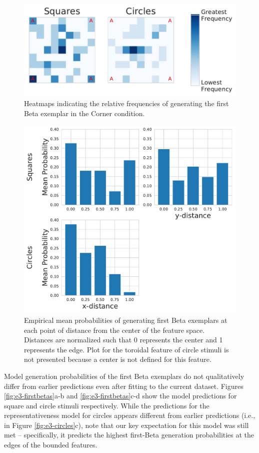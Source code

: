 \documentclass[pdflatex,sn-apa]{sn-jnl}%
\theoremstyle{thmstyleone}%
\theoremstyle{thmstyletwo}%
\theoremstyle{thmstylethree}%
\begin{document}
\begin{figure}
    \begin{center}
      \includegraphics[width=.6\textwidth]{figs/e3-behave.pdf}
    \caption{Heatmaps indicating the relative frequencies of generating the
      first Beta exemplar in the Corner condition.}
    \label{fig:e3-behave}
    \end{center}
\end{figure}

\begin{figure}
    \begin{center}
      \includegraphics[width=.6\textwidth]{figs/e3-distcent.pdf}
      \caption{Empirical mean probabilities of generating first Beta exemplars
        at each point of distance from the center of the feature space.
        Distances are normalized such that 0 represents the center and 1
        represents the edge. Plot for the toroidal feature of circle stimuli is
        not presented because a center is not defined for this feature.}
    \label{fig:e3-distcent}
    \end{center}
\end{figure}


Model generation probabilities of the first Beta exemplars do not qualitatively differ from earlier predictions even
after fitting to the current dataset. Figures \ref{fig:e3-firstbetas}a-b and \ref{fig:e3-firstbetas}c-d show the model
predictions for square and circle stimuli respectively. While the predictions for the representativeness model for
circles appears different from earlier predictions (i.e., in Figure \ref{fig:e3-circles}c), note that our key
expectation for this model was still met -- specifically, it predicts the highest first-Beta generation probabilities at
the edges of the bounded features.
\end{document}
